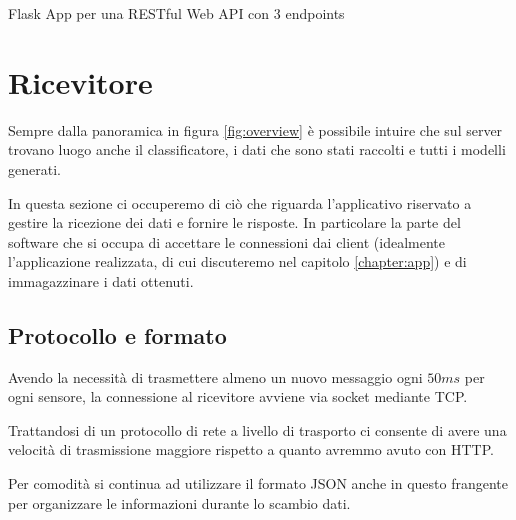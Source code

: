 \begin{listing}[H] 
    \inputminted[frame=single,framesep=10pt]{python}{assets/snippets/server/api/flask.py}
    \caption{Flask App per una RESTful Web API con 3 endpoints}
\end{listing}



\section{Ricevitore}
\label{section:receiver}
Sempre dalla panoramica in figura \ref{fig:overview} è possibile intuire che sul server 
trovano luogo anche il classificatore, i dati che sono stati raccolti e tutti i modelli generati. 

In questa sezione ci occuperemo di ciò che riguarda l'applicativo riservato a gestire la ricezione dei dati e fornire le risposte. 
In particolare la parte del software che si occupa di accettare le connessioni dai client (idealmente l'applicazione realizzata, di cui 
discuteremo nel capitolo \ref{chapter:app}) e di immagazzinare i dati ottenuti.

\subsection{Protocollo e formato}
Avendo la necessità di trasmettere almeno un nuovo messaggio ogni $50ms$ per ogni sensore, la 
connessione al ricevitore avviene via socket mediante TCP. 

Trattandosi di un 
protocollo di rete a livello di trasporto ci consente di avere una velocità 
di trasmissione maggiore rispetto a quanto avremmo avuto con HTTP. 

Per comodità si continua ad utilizzare il formato JSON anche in questo frangente per organizzare le informazioni durante lo scambio dati.


